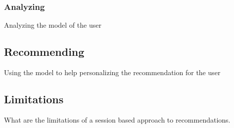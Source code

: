 \subsubsection{Analyzing}
    Analyzing the model of the user

\subsection{Recommending}
    Using the model to help personalizing the recommendation for the user

\subsection{Limitations}
    What are the limitations of a session based approach to recommendations.

